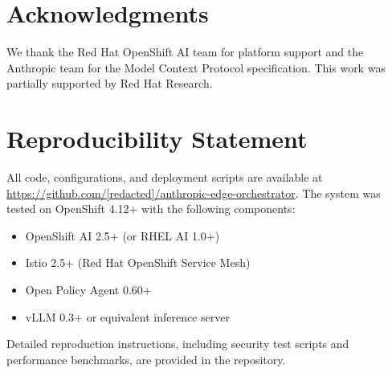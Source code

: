 \documentclass[11pt]{article}
\begin{document}
\section*{Acknowledgments}

We thank the Red Hat OpenShift AI team for platform support and the Anthropic team for the Model Context Protocol specification. This work was partially supported by Red Hat Research.

\section*{Reproducibility Statement}

All code, configurations, and deployment scripts are available at \url{https://github.com/[redacted]/anthropic-edge-orchestrator}. The system was tested on OpenShift 4.12+ with the following components:
\begin{itemize}
\item OpenShift AI 2.5+ (or RHEL AI 1.0+)
\item Istio 2.5+ (Red Hat OpenShift Service Mesh)
\item Open Policy Agent 0.60+
\item vLLM 0.3+ or equivalent inference server
\end{itemize}

Detailed reproduction instructions, including security test scripts and performance benchmarks, are provided in the repository.
\end{document}
